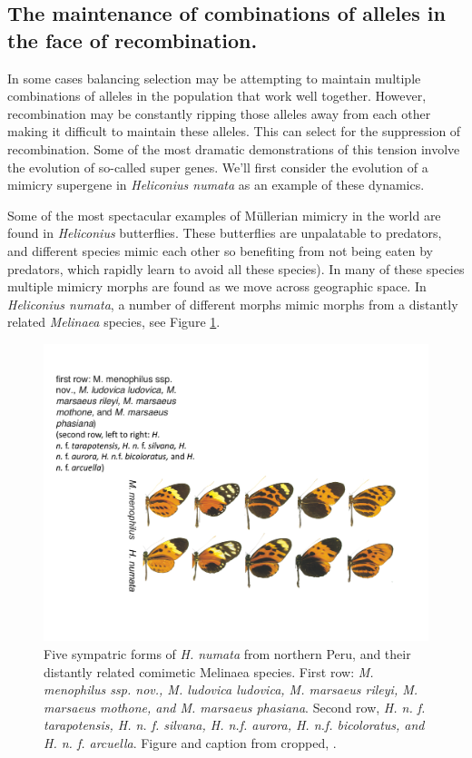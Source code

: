 \subsection{The maintenance of combinations of alleles in the face of recombination.} \label{epistasis_inversion}

In some cases balancing selection may be attempting to maintain multiple combinations of alleles in the population that work well together. However, recombination may be constantly ripping those alleles away from each other making it difficult to maintain these alleles. This can select for the suppression of recombination. Some of the most dramatic demonstrations of this tension involve the evolution of so-called super genes. We'll first consider the evolution of a mimicry supergene in {\it Heliconius numata} as an example of these dynamics.  

Some of the most spectacular examples of M{\"u}llerian mimicry in the world are found in {\it Heliconius} butterflies. These butterflies are unpalatable to predators, and different species mimic each other so benefiting from not being eaten by predators, which rapidly learn to avoid all these species). In many of these species multiple mimicry morphs are found as we move across geographic space. In  {\it Heliconius numata}, a number of different morphs mimic morphs from a distantly related {\it Melinaea} species, see Figure \ref{fig:H_numata}.

\begin{figure} %
\begin{center}
  \includegraphics[width = \textwidth]{Journal_figs/recom_selection/H_numata/H_numata.pdf}
\end{center}
\caption{Five sympatric forms of {\it H. numata} from northern Peru, and their distantly related comimetic Melinaea species.  First row: {\it M. menophilus ssp. nov., M. ludovica ludovica, M. marsaeus rileyi, M. marsaeus mothone, and M. marsaeus phasiana}. Second row, {\it H. n. f. tarapotensis, H. n. f. silvana, H. n.f. aurora, H. n.f. bicoloratus, and H. n. f. arcuella}. Figure and caption from \citet{joron2006conserved} cropped, \PLOSccBY. } \label{fig:H_numata}  %
\end{figure}

